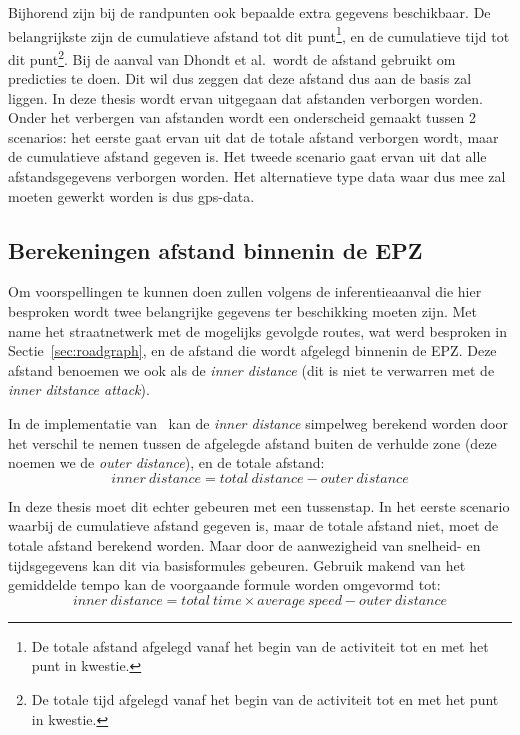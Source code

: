 Bijhorend zijn bij de randpunten ook bepaalde extra gegevens beschikbaar. De
belangrijkste zijn de cumulatieve afstand tot dit punt\footnote{De totale
    afstand afgelegd vanaf het begin van de activiteit tot en met het punt in
    kwestie.}, en de cumulatieve tijd tot dit punt\footnote{De totale tijd afgelegd
    vanaf het begin van de activiteit tot en met het punt in kwestie.}. Bij de
aanval van Dhondt et al.\ wordt de afstand gebruikt om predicties te doen. Dit
wil dus zeggen dat deze afstand dus aan de basis zal liggen. In deze thesis
wordt ervan uitgegaan dat afstanden verborgen worden. Onder het verbergen van
afstanden wordt een onderscheid gemaakt tussen 2 scenarios: het eerste gaat
ervan uit dat de totale afstand verborgen wordt, maar de cumulatieve afstand
gegeven is. Het tweede scenario gaat ervan uit dat alle afstandsgegevens
verborgen worden. Het alternatieve type data waar dus mee zal moeten gewerkt
worden is dus \ac{gps}-data.

\subsection{Berekeningen afstand binnenin de EPZ}\label{sec:berekeningen}
Om voorspellingen te kunnen doen zullen volgens de inferentieaanval die hier
besproken wordt twee belangrijke gegevens ter beschikking moeten zijn. Met name
het straatnetwerk met de mogelijks gevolgde routes, wat werd besproken in
Sectie~\ref{sec:roadgraph}, en de afstand die wordt afgelegd binnenin de
\ac{EPZ}. Deze afstand benoemen we ook als de \textit{inner distance} (dit is
niet te verwarren met de \textit{inner ditstance attack}).

In de implementatie van~\citeauthor{Dhondt} kan de \textit{inner distance}
simpelweg berekend worden door het verschil te nemen tussen de afgelegde
afstand buiten de verhulde zone (deze noemen we de \textit{outer distance}), en
de totale afstand: \[inner\ distance = total\
    distance - outer\ distance \]

In deze thesis moet dit echter gebeuren met een tussenstap. In het eerste
scenario waarbij de cumulatieve afstand gegeven is, maar de totale afstand
niet, moet de totale afstand berekend worden. Maar door de aanwezigheid van
snelheid- en tijdsgegevens kan dit via basisformules gebeuren. Gebruik makend
van het gemiddelde tempo kan de voorgaande formule worden omgevormd tot: \[inner\ distance = total\ time \times average\ speed - outer\ distance \]

